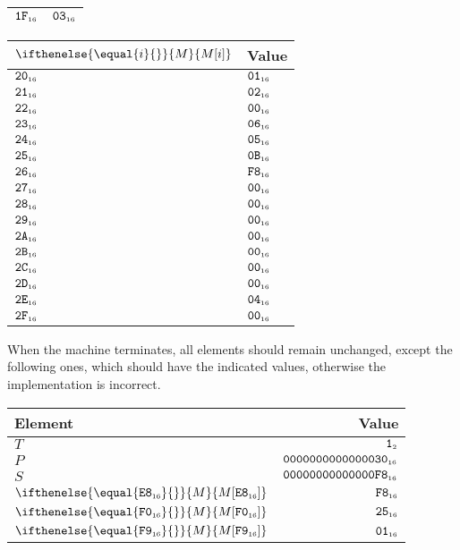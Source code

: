\documentclass[a4paper,12pt]{article}
\newcommand{\num}[1]{\texttt{#1}}
\newcommand{\hex}[1]{\num{#1}_{\textup{\tiny 16}}}
\newcommand{\bin}[1]{\num{#1}_{\textup{\tiny 2}}}
\newcommand{\MEM}[1]{\ifthenelse{\equal{#1}{}}{M}{M[#1]}}
\newcommand{\PC}{P}
\newcommand{\SP}{S}
\newcommand{\TERM}{T}
\newcommand{\T}{\bin{1}}
\begin{document}
\begin{center}
\begin{tabular}{@{}ll@{}}
    $\hex{1F}$ & $\hex{03}$ \\
    \hline
  \end{tabular}
  \hfil
  \begin{tabular}{@{}ll@{}}
    \hline
    $\MEM{i}$  & Value \\
    \hline
    $\hex{20}$ & $\hex{01}$ \\
    $\hex{21}$ & $\hex{02}$ \\
    $\hex{22}$ & $\hex{00}$ \\
    $\hex{23}$ & $\hex{06}$ \\
    $\hex{24}$ & $\hex{05}$ \\
    $\hex{25}$ & $\hex{0B}$ \\
    $\hex{26}$ & $\hex{F8}$ \\
    $\hex{27}$ & $\hex{00}$ \\
    $\hex{28}$ & $\hex{00}$ \\
    $\hex{29}$ & $\hex{00}$ \\
    $\hex{2A}$ & $\hex{00}$ \\
    $\hex{2B}$ & $\hex{00}$ \\
    $\hex{2C}$ & $\hex{00}$ \\
    $\hex{2D}$ & $\hex{00}$ \\
    $\hex{2E}$ & $\hex{04}$ \\
    $\hex{2F}$ & $\hex{00}$ \\
    \hline
  \end{tabular}
\end{center}

When the machine terminates, all elements should remain unchanged, except the following ones, which should have the indicated values, otherwise the implementation is incorrect.

\begin{center}
  \begin{tabular}{@{}lr@{}}
    \hline
    Element          & Value                     \\
    \hline
    $\TERM$          & $\T$                      \\
    $\PC$            & $\hex{0000000000000030}$ \\
    $\SP$            & $\hex{00000000000000F8}$ \\
    $\MEM{\hex{E8}}$ & $\hex{F8}$ \\
    $\MEM{\hex{F0}}$ & $\hex{25}$ \\
    $\MEM{\hex{F9}}$ & $\hex{01}$ \\
    \hline
  \end{tabular}
\end{center}
\end{document}
